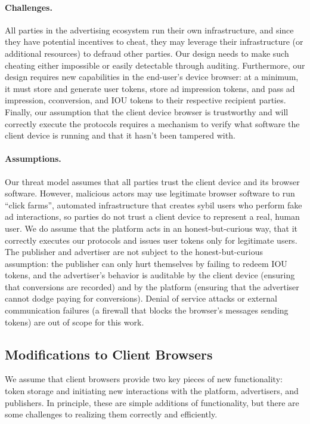 \paragraph{Challenges.}
%
All parties in the advertising ecosystem run their own infrastructure, and since they have potential incentives to cheat, they may leverage their infrastructure (or additional resources) to defraud other parties.
%
Our design needs to make such cheating either impossible or easily detectable through auditing.
%
Furthermore, our design requires new capabilities in the end-user's device browser: at a minimum, it must store and generate user tokens, store ad impression tokens, and pass ad impression, cconversion, and IOU tokens to their respective recipient parties.
%
Finally, our assumption that the client device browser is trustworthy and will correctly execute the protocols requires a mechanism to verify what software the client device is running and that it hasn't been tampered with.
%

\paragraph{Assumptions.}
%
Our threat model assumes that all parties trust the client device and its browser software.
%
However, malicious actors may use legitimate browser software to run ``click farms'', automated infrastructure that creates sybil users who perform fake ad interactions, so parties do not trust a client device to represent a real, human user.
%
We do assume that the platform acts in an honest-but-curious way, \ie that it correctly executes our protocols and issues user tokens only for legitimate users.
%
The publisher and advertiser are not subject to the honest-but-curious assumption: the publisher can only hurt themselves by failing to redeem IOU tokens, and the advertiser's behavior is auditable by the client device (ensuring that conversions are recorded) and by the platform (ensuring that the advertiser cannot dodge paying for conversions).
%
Denial of service attacks or external communication failures (\eg a firewall that blocks the browser's messages sending tokens) are out of scope for this work.
%

\subsection{Modifications to Client Browsers}
\label{s:browser}
%
We assume that client browsers provide two key pieces of new functionality: token storage and initiating new interactions with the platform, advertisers, and publishers.
%
In principle, these are simple additions of functionality, but there are some challenges to realizing them correctly and efficiently.
%

